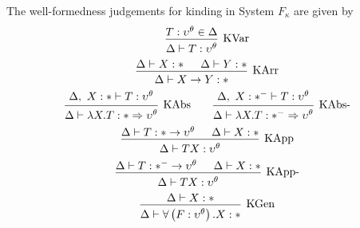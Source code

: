 \documentclass[../../Dissertation.tex]{subfiles}
\begin{document}
\begin{definition} 
The well-formedness judgements for kinding in System $F_\kappa$ are given by
\begin{equation*}
  \begin{prooftree}
    \hypo{T : \upsilon^\theta \in \Delta}
    \infer1[KVar]{\Delta \vdash T : \upsilon^\theta}
  \end{prooftree}
\end{equation*}
\begin{equation*}
  \begin{prooftree}
    \hypo{\Delta \vdash X : *}
    \hypo{\Delta \vdash Y : *}
    \infer2[KArr]{\Delta \vdash X \rightarrow Y : *}
  \end{prooftree}
\end{equation*}
\begin{equation*}
  \begin{prooftree}
    \hypo{\Delta,\ X : * \vdash T : \upsilon^\theta}
    \infer1[KAbs]{\Delta \vdash \lambda X.T : * \Rightarrow \upsilon^\theta}
  \end{prooftree}\qquad
  \begin{prooftree}
      \hypo{\Delta,\ X : *^- \vdash T : \upsilon^\theta}
      \infer1[KAbs-]{\Delta \vdash \lambda X.T : *^- \Rightarrow \upsilon^\theta}
  \end{prooftree}
\end{equation*}
\begin{equation*}
  \begin{prooftree}
    \hypo{\Delta \vdash T : * \rightarrow \upsilon^\theta}
    \hypo{\Delta \vdash X : *}
    \infer2[KApp]{\Delta \vdash T X : \upsilon^\theta}
  \end{prooftree}
\end{equation*}
\begin{equation*} 
  \begin{prooftree}
    \hypo{\Delta \vdash T : *^- \rightarrow \upsilon^\theta}
    \hypo{\Delta \vdash X : *}
    \infer2[KApp-]{\Delta \vdash T X : \upsilon^\theta}
  \end{prooftree}
\end{equation*}
\begin{equation*}
  \begin{prooftree}
    \hypo{\Delta \vdash X : *}
    \infer1[KGen]{\Delta \vdash \forall \left(F : \upsilon^\theta\right).X : *}
  \end{prooftree}
\end{equation*}
\end{definition}
\end{document}
